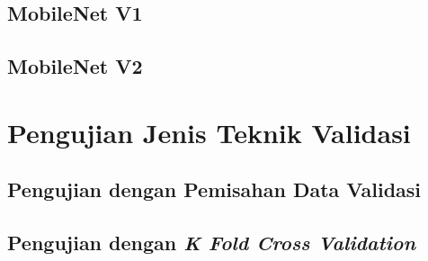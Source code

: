 \subsection{MobileNet V1}
\label{mobilenetv1}

\subsection{MobileNet V2}
\label{mobilenetv2}

\section{Pengujian Jenis Teknik Validasi}
\label{sec:pengujian-validation}

\subsection{Pengujian dengan Pemisahan Data Validasi}
\label{normal-validasi}

\subsection{Pengujian dengan \textit{K Fold Cross Validation}}
\label{cross-validasi}